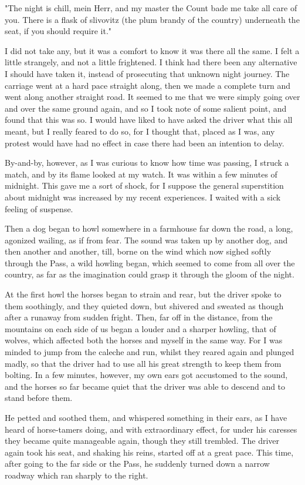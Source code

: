 "The night is chill, mein Herr, and my master the Count bade me take all care of you. There is a flask of slivovitz (the plum brandy of the country) underneath the seat, if you should require it." 

I did not take any, but it was a comfort to know it was there all the same. I felt a little strangely, and not a little frightened. I think had there been any alternative I should have taken it, instead of prosecuting that unknown night journey. The carriage went at a hard pace straight along, then we made a complete turn and went along another straight road. It seemed to me that we were simply going over and over the same ground again, and so I took note of some salient point, and found that this was so. I would have liked to have asked the driver what this all meant, but I really feared to do so, for I thought that, placed as I was, any protest would have had no effect in case there had been an intention to delay. 

By-and-by, however, as I was curious to know how time was passing, I struck a match, and by its flame looked at my watch. It was within a few minutes of midnight. This gave me a sort of shock, for I suppose the general superstition about midnight was increased by my recent experiences. I waited with a sick feeling of suspense. 

Then a dog began to howl somewhere in a farmhouse far down the road, a long, agonized wailing, as if from fear. The sound was taken up by another dog, and then another and another, till, borne on the wind which now sighed softly through the Pass, a wild howling began, which seemed to come from all over the country, as far as the imagination could grasp it through the gloom of the night. 

At the first howl the horses began to strain and rear, but the driver spoke to them soothingly, and they quieted down, but shivered and sweated as though after a runaway from sudden fright. Then, far off in the distance, from the mountains on each side of us began a louder and a sharper howling, that of wolves, which affected both the horses and myself in the same way. For I was minded to jump from the caleche and run, whilst they reared again and plunged madly, so that the driver had to use all his great strength to keep them from bolting. In a few minutes, however, my own ears got accustomed to the sound, and the horses so far became quiet that the driver was able to descend and to stand before them. 

He petted and soothed them, and whispered something in their ears, as I have heard of horse-tamers doing, and with extraordinary effect, for under his caresses they became quite manageable again, though they still trembled. The driver again took his seat, and shaking his reins, started off at a great pace. This time, after going to the far side or the Pass, he suddenly turned down a narrow roadway which ran sharply to the right. 

